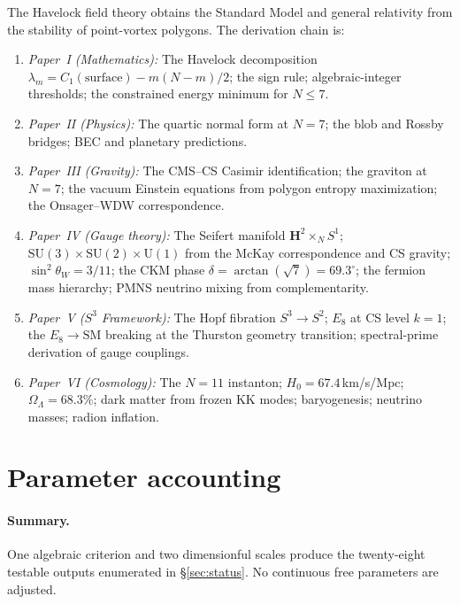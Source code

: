 The Havelock field theory obtains the Standard Model and
general relativity from the stability of point-vortex polygons.
The derivation chain is:
\begin{enumerate}
\item \emph{Paper~I (Mathematics):}
  The Havelock decomposition
  $\lambda_m = C_1(\text{surface}) - m(N{-}m)/2$;
  the sign rule; algebraic-integer thresholds;
  the constrained energy minimum for $N \le 7$.
\item \emph{Paper~II (Physics):}
  The quartic normal form at $N = 7$;
  the blob and Rossby bridges;
  BEC and planetary predictions.
\item \emph{Paper~III (Gravity):}
  The CMS--CS Casimir identification;
  the graviton at $N = 7$;
  the vacuum Einstein equations from polygon entropy
  maximization; the Onsager--WDW correspondence.
\item \emph{Paper~IV (Gauge theory):}
  The Seifert manifold
  $\mathbf{H}^2 \times_N S^1$;
  $\mathrm{SU}(3) \times \mathrm{SU}(2) \times \mathrm{U}(1)$
  from the McKay correspondence and CS gravity;
  $\sin^2\theta_W = 3/11$; the CKM phase $\delta = \arctan(\sqrt{7}) = 69.3^\circ$;
  the fermion mass hierarchy; PMNS neutrino mixing from complementarity.
\item \emph{Paper~V ($S^3$ Framework):}
  The Hopf fibration $S^3 \to S^2$; $E_8$ at CS level $k = 1$;
  the $E_8 \to \mathrm{SM}$ breaking at the Thurston geometry
  transition; spectral-prime derivation of gauge couplings.
\item \emph{Paper~VI (Cosmology):}
  The $N = 11$ instanton;
  $H_0 = 67.4$\,km/s/Mpc; $\Omega_\Lambda = 68.3\%$;
  dark matter from frozen KK modes; baryogenesis;
  neutrino masses; radion inflation.
\end{enumerate}


\section{Parameter accounting}
\label{sec:parameters}

\paragraph{Summary.}
One algebraic criterion and two dimensionful scales produce the
twenty-eight testable outputs enumerated in \S\ref{sec:status}.
No continuous free parameters are adjusted.

